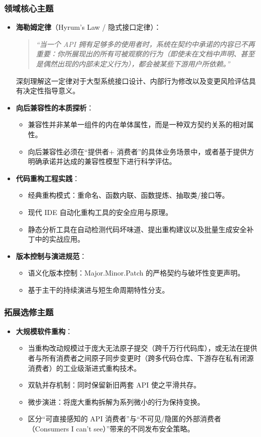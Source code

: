 \subsubsection{领域核心主题}
\begin{itemize}
    \item \textbf{海勒姆定律}（Hyrum's Law / 隐式接口定律）：
    \begin{quote}
    \emph{“当一个 API 拥有足够多的使用者时，系统在契约中承诺的内容已不再重要：你所展现出的所有可被观察的行为（即使未在文档中声明、甚至是偶然出现的内部未定义行为），都会被某些下游用户所依赖。”}
    \end{quote}
    深刻理解这一定律对于大型系统接口设计、内部行为修改以及变更风险评估具有决定性指导意义。
    \item \textbf{向后兼容性的本质探析}：
    \begin{itemize}
        \item 兼容性并非某单一组件的内在单体属性，而是一种双方契约关系的相对属性。
        \item 向后兼容性必须在“提供者+ 消费者”的具体业务场景中，或者基于提供方明确承诺并达成的兼容性模型下进行科学评估。
    \end{itemize}
    \item \textbf{代码重构工程实践}：
    \begin{itemize}
        \item 经典重构模式：重命名、函数内联、函数提炼、抽取类/接口等。
        \item 现代 IDE 自动化重构工具的安全应用与原理。
        \item 静态分析工具在自动检测代码坏味道、提出重构建议以及批量生成安全补丁中的实战应用。
    \end{itemize}
    \item \textbf{版本控制与演进规范}：
    \begin{itemize}
        \item 语义化版本控制：Major.Minor.Patch 的严格契约与破坏性变更声明。
        \item 基于主干的持续演进与短生命周期特性分支。
    \end{itemize}
\end{itemize}

\subsubsection{拓展选修主题}
\begin{itemize}
    \item \textbf{大规模软件重构}：
    \begin{itemize}
        \item 当重构改动规模过于庞大无法原子提交（跨千万行代码库），或无法在提供者与所有消费者之间原子同步变更时（跨多代码仓库、下游存在私有闭源消费者）的工业级渐进式重构技术。
        \item 双轨并存机制：同时保留新旧两套 API 使之平滑共存。
        \item 微步演进：将庞大重构拆解为系列微小的行为保持变换。
        \item 区分“可直接感知的 API 消费者”与“不可见/隐匿的外部消费者（Consumers I can't see）”带来的不同发布安全策略。
    \end{itemize}
\end{itemize}

